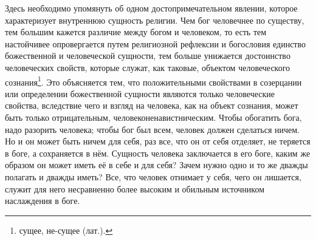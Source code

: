 \documentclass[12pt,oneside]{book}
\begin{document}
Здесь необходимо упомянуть об одном достопримечательном явлении, которое характеризует внутреннюю сущность религии. Чем бог человечнее по существу, тем большим кажется различие между богом и человеком, то есть тем настойчивее опровергается путем религиозной рефлексии и богословия единство божественной и человеческой сущности, тем больше унижается достоинство человеческих свойств, которые служат, как таковые, объектом человеческого сознания\ddag\let\svthefootnote\thefootnote\let\thefootnote\relax{}\let\thefootnote\svthefootnote\footnote{сущее, не-сущее (лат.).}. Это объясняется тем, что положительными свойствами в созерцании или определении божественной сущности являются только человеческие свойства, вследствие чего и взгляд на человека, как на объект сознания, может быть только отрицательным, человеконенавистническим. Чтобы обогатить бога, надо разорить человека; чтобы бог был всем, человек должен сделаться ничем. Но и он может быть ничем для себя, раз все, что он от себя отделяет, не теряется в боге, а сохраняется в нём. Сущность человека заключается в его боге, каким же образом он может иметь её в себе и для себя? Зачем нужно одно и то же дважды полагать и дважды иметь? Все, что человек отнимает у себя, чего он лишается, служит для него несравненно более высоким и обильным источником наслаждения в боге.
\end{document}
